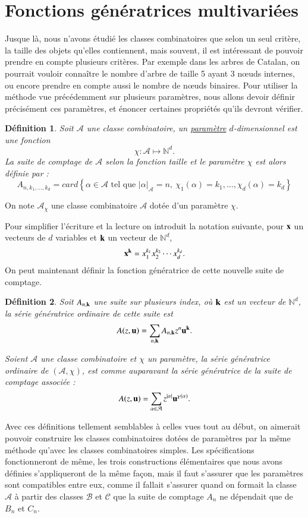 \documentclass[12pt]{report}
\newtheorem*{definition}{Définition}
\begin{document}
\section{Fonctions génératrices multivariées}
Jusque là, nous n'avons étudié les classes combinatoires que selon un seul critère, la taille des objets qu'elles contiennent, mais souvent, il est intéressant de pouvoir prendre en compte plusieurs critères. Par exemple dans les arbres de Catalan, on pourrait vouloir connaître le nombre d'arbre de taille 5 ayant 3 nœuds internes,  ou encore prendre en compte aussi le nombre de nœuds binaires.
Pour utiliser la méthode vue précédemment sur plusieurs paramètres, nous allons devoir définir précisément ces paramètres, et énoncer certaines propriétés qu'ils devront vérifier.
\begin{definition}
  Soit $\mathcal A$ une classe combinatoire, un \underline{paramètre} $d$-dimensionnel est une fonction
  $$\chi : \mathcal A \mapsto \mathbb N^d.$$
  La suite de comptage de $\mathcal A$ selon la fonction taille et le paramètre $\chi$ est alors définie par :
  $$A_{n,k_1,\dots,k_d} = card\left \{\alpha \in \mathcal A \text{ tel que }  | \alpha|_{\mathcal A} = n,\ \chi_1(\alpha)=k_1,\dots,\chi_d(\alpha)=k_d \right \}$$
\end{definition}

On note $\mathcal A_{\chi}$ une classe combinatoire $\mathcal A$ dotée d'un paramètre $\chi$.

Pour simplifier l'écriture et la lecture on introduit la notation suivante, pour $\bold{x}$ un vecteurs de $d$ variables et $\bold{k}$ un vecteur de $\mathbb N^d$,
$$\bold{x^k} = x_1^{k_1}x_2^{k_2}\cdots x_d^{k_d}.$$
On peut maintenant définir la fonction génératrice de cette nouvelle suite de comptage.
\begin{definition}
  Soit $A_{n,\bold k}$ une suite sur plusieurs index, où $\bold{k}$ est un vecteur de $\mathbb N^d$,
  la série génératrice ordinaire de cette suite est 
  $$A(z,\bold{u}) = \sum_{n,\bold k}  A_{n,\bold{k}}z^n\bold{u^k}.$$
  
Soient $\mathcal A$ une classe combinatoire et $\chi$ un paramètre, la série génératrice ordinaire de $(\mathcal A, \chi)$, est comme auparavant la série génératrice de la suite de comptage associée :
$$A(z,\bold u) = \sum_{\alpha \in \mathcal A}z^{|\alpha|}\bold u^{\chi (\alpha)}.$$
\end{definition}

Avec ces définitions tellement semblables à celles vues tout au début, on aimerait pouvoir construire les classes combinatoires dotées de paramètres par la même méthode qu'avec les classes combinatoires simples. Les spécifications fonctionneront de même, les trois constructions élémentaires que nous avons définies s'appliqueront de la même façon, mais il faut s'assurer que les paramètres sont compatibles entre eux, comme il fallait s'assurer quand on formait la classe $\mathcal A$ à partir des classes $\mathcal B$ et $\mathcal C$ que la suite de comptage $A_n$ ne dépendait que de $B_n$ et $C_n$.
\end{document}
